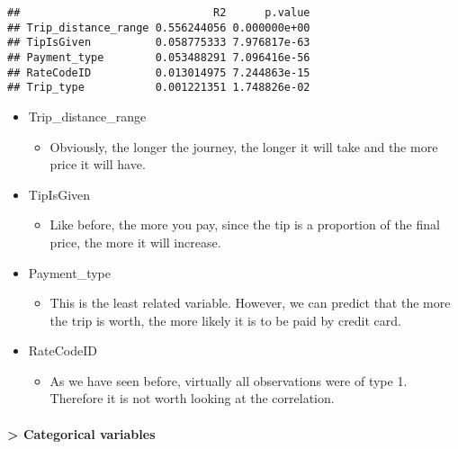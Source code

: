 \documentclass[
  18pt,
  a4paper]{article}
\newenvironment{Shaded}{\begin{snugshade}}{\end{snugshade}}
\newcommand{\CommentTok}[1]{\textcolor[rgb]{0.56,0.35,0.01}{\textit{#1}}}
\newcommand{\NormalTok}[1]{#1}
\newcommand{\OperatorTok}[1]{\textcolor[rgb]{0.81,0.36,0.00}{\textbf{#1}}}
\providecommand{\tightlist}{%
  \setlength{\itemsep}{0pt}\setlength{\parskip}{0pt}}
\begin{document}
\begin{Shaded}
\end{Shaded}

\begin{verbatim}
##                              R2      p.value
## Trip_distance_range 0.556244056 0.000000e+00
## TipIsGiven          0.058775333 7.976817e-63
## Payment_type        0.053488291 7.096416e-56
## RateCodeID          0.013014975 7.244863e-15
## Trip_type           0.001221351 1.748826e-02
\end{verbatim}

\begin{itemize}
\tightlist
\item
  Trip\_distance\_range

  \begin{itemize}
  \tightlist
  \item
    Obviously, the longer the journey, the longer it will take and the
    more price it will have.
  \end{itemize}
\item
  TipIsGiven

  \begin{itemize}
  \tightlist
  \item
    Like before, the more you pay, since the tip is a proportion of the
    final price, the more it will increase.
  \end{itemize}
\item
  Payment\_type

  \begin{itemize}
  \tightlist
  \item
    This is the least related variable. However, we can predict that the
    more the trip is worth, the more likely it is to be paid by credit
    card.
  \end{itemize}
\item
  RateCodeID

  \begin{itemize}
  \tightlist
  \item
    As we have seen before, virtually all observations were of type 1.
    Therefore it is not worth looking at the correlation.
  \end{itemize}
\end{itemize}

\hypertarget{categorical-variables}{%
\paragraph{\textgreater{} Categorical
variables}\label{categorical-variables}}
\end{document}
